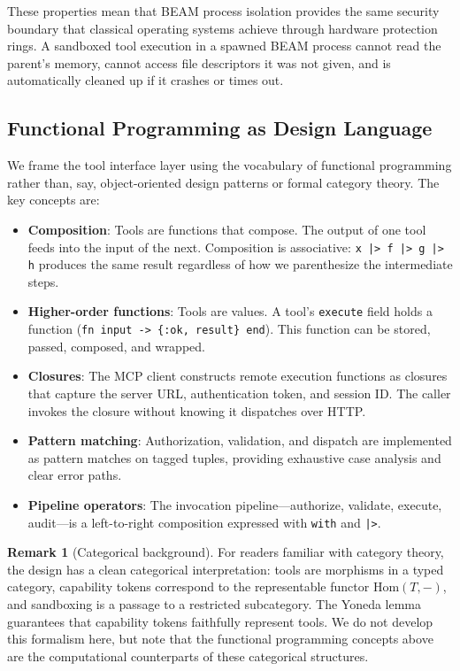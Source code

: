 \documentclass[12pt,a4paper]{article}
\theoremstyle{plain}
\theoremstyle{definition}
\newtheorem{remark}[theorem]{Remark}
\begin{document}
These properties mean that BEAM process isolation provides the same security boundary that classical operating systems achieve through hardware protection rings. A sandboxed tool execution in a spawned BEAM process cannot read the parent's memory, cannot access file descriptors it was not given, and is automatically cleaned up if it crashes or times out.

\subsection{Functional Programming as Design Language}

We frame the tool interface layer using the vocabulary of functional programming rather than, say, object-oriented design patterns or formal category theory. The key concepts are:

\begin{itemize}[leftmargin=2em]
\item \textbf{Composition}: Tools are functions that compose. The output of one tool feeds into the input of the next. Composition is associative: \texttt{x |> f |> g |> h} produces the same result regardless of how we parenthesize the intermediate steps.
\item \textbf{Higher-order functions}: Tools are values. A tool's \texttt{execute} field holds a function (\texttt{fn input -> \{:ok, result\} end}). This function can be stored, passed, composed, and wrapped.
\item \textbf{Closures}: The MCP client constructs remote execution functions as closures that capture the server URL, authentication token, and session ID. The caller invokes the closure without knowing it dispatches over HTTP.
\item \textbf{Pattern matching}: Authorization, validation, and dispatch are implemented as pattern matches on tagged tuples, providing exhaustive case analysis and clear error paths.
\item \textbf{Pipeline operators}: The invocation pipeline---authorize, validate, execute, audit---is a left-to-right composition expressed with \texttt{with} and \texttt{|>}.
\end{itemize}

\begin{remark}[Categorical background]
For readers familiar with category theory, the design has a clean categorical interpretation: tools are morphisms in a typed category, capability tokens correspond to the representable functor $\mathrm{Hom}(T, -)$, and sandboxing is a passage to a restricted subcategory. The Yoneda lemma guarantees that capability tokens faithfully represent tools. We do not develop this formalism here, but note that the functional programming concepts above are the computational counterparts of these categorical structures.
\end{remark}
\end{document}
